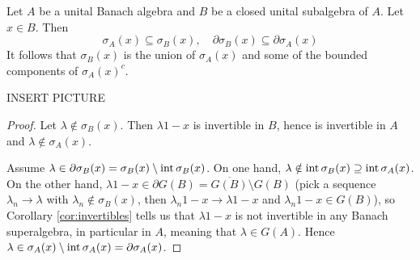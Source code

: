 \documentclass{article}
\begin{document}
\begin{thm}
  Let $A$ be a unital Banach algebra and $B$ be a closed unital subalgebra of $A$. Let $x \in B$. Then
  $$\sigma_A(x) \subseteq \sigma_B(x), \quad \partial \sigma_B(x) \subseteq \partial \sigma_A(x)$$
  It follows that $\sigma_B(x)$ is the union of $\sigma_A(x)$ and some of the bounded components of $\sigma_A(x)^c$.

  INSERT PICTURE
\end{thm}
\begin{proof}
  Let $\lambda \nin \sigma_B(x)$. Then $\lambda 1 - x$ is invertible in $B$, hence is invertible in $A$ and $\lambda \nin \sigma_A(x)$.

  Assume $\lambda \in \partial \sigma_B(x) = \sigma_B(x) \setminus \operatorname{int} \sigma_B(x)$. On one hand, $\lambda \notin \operatorname{int} \sigma_B(x) \supseteq \operatorname{int} \sigma_A(x)$. On the other hand, $\lambda 1 - x \in \partial G(B) = \overline{G(B)} \setminus G(B)$ (pick a sequence $\lambda_n \to \lambda$ with $\lambda_n \nin \sigma_B(x)$, then $\lambda_n 1 - x \to \lambda 1 - x$ and $\lambda_n 1 - x \in G(B)$), so Corollary \ref{cor:invertibles} tells us that $\lambda 1 - x$ is not invertible in any Banach superalgebra, in particular in $A$, meaning that $\lambda \in G(A)$. Hence $\lambda \in \sigma_A(x) \setminus \operatorname{int} \sigma_A(x) = \partial \sigma_A(x)$.
\end{proof}

\printindex
\end{document}

